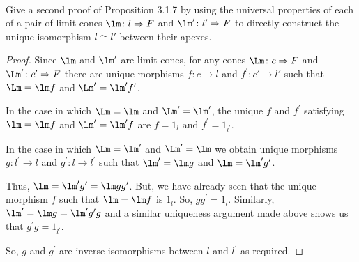 \documentclass[main.tex]{subfiles}
\begin{document}
\paragraph{}
\begin{exercise}
	Give a second proof of Proposition 3.1.7 by using the universal properties
	of each of a pair of limit cones $ \lm \colon l \Rightarrow F $ and $
	\lm' \colon l' \Rightarrow F $ to directly construct the unique
	isomorphism $ l \cong l' $ between their apexes.
\end{exercise}

\begin{proof}
Since $ \lm $ and $ \lm' $ are limit cones, for any cones $
\Lm\colon c\Rightarrow F $ and  $ \Lm'\colon c^\prime\Rightarrow F $ there are
unique morphisms $ f \colon c\rightarrow l $ and $ f^\prime \colon c'
\rightarrow l' $ such that $\Lm =\lm f$ and $\Lm^\prime
=\lm^\prime f^\prime$.

In the case in which $\Lm=\lm$ and $\Lm^\prime =\lm^\prime$, the
unique $f$ and $f^\prime$ satisfying $\lm=\lm f$ and $\lm^\prime
=\lm^\prime f$ are $f=1_l$ and $f^\prime =1_{l^\prime}$.

In the case in which $\Lm=\lm^\prime$ and $\Lm^\prime =\lm$ we
obtain unique morphisms $g\colon l^\prime\rightarrow l$ and $g^\prime\colon l\rightarrow
l^\prime$ such that $\lm^\prime =\lm g$ and $\lm =\lm^\prime
g^\prime$.

Thus, $\lm =\lm^\prime g^\prime =\lm gg^\prime$. But, we have
already seen that the unique morphism $f$ such that $\lm =\lm f$ is
$1_l$. So, $gg^\prime =1_l$. Similarly, $\lm^\prime =\lm
g=\lm^\prime g^\prime g$ and a similar uniqueness argument made above shows
us that $g^\prime g=1_{l^\prime}$.

So, $g$ and $g^\prime$ are inverse isomorphisms between $l$ and $l^\prime$ as
required.

\end{proof}
\end{document}
